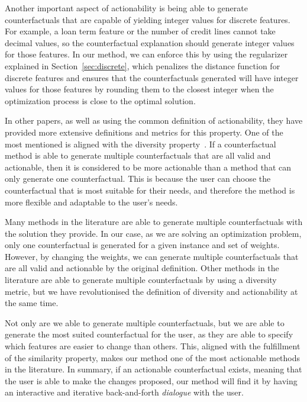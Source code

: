 \documentclass[12pt]{extarticle}
\numberwithin{equation}{section}
\begin{document}
Another important aspect of actionability is being able to generate counterfactuals that are capable of yielding integer values for discrete features. For example, a loan term feature or the number of credit lines cannot take decimal values, so the counterfactual explanation should generate integer values for those features. In our method, we can enforce this by using the regularizer explained in Section~\ref{sec:discrete}, which penalizes the distance function for discrete features and ensures that the counterfactuals generated will have integer values for those features by rounding them to the closest integer when the optimization process is close to the optimal solution.

In other papers, as well as using the common definition of actionability, they have provided more extensive definitions and metrics for this property. One of the most mentioned is aligned with the diversity property~\cite{dice}. If a counterfactual method is able to generate multiple counterfactuals that are all valid and actionable, then it is considered to be more actionable than a method that can only generate one counterfactual. This is because the user can choose the counterfactual that is most suitable for their needs, and therefore the method is more flexible and adaptable to the user's needs. 

Many methods in the literature are able to generate multiple counterfactuals with the  solution they provide. In our case, as we are solving an optimization problem, only one counterfactual is generated for a given instance and set of weights. However, by changing the weights, we can generate multiple counterfactuals that are all valid and actionable by the original definition. Other methods in the literature are able to generate multiple counterfactuals by using a diversity metric, but we have revolutionised the definition of diversity and actionability at the same time. 

Not only are we able to generate multiple counterfactuals, but we are able to generate the most suited counterfactual for the user, as they are able to specify which features are easier to change than others. This, aligned with the fulfillment of the similarity property, makes our method one of the most actionable methods in the literature. In summary, if an actionable counterfactual exists, meaning that the user is able to make the changes proposed, our method will find it by having an interactive and iterative back-and-forth \emph{dialogue} with the user.
\end{document}
